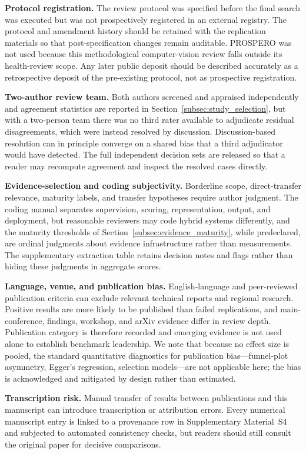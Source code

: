 \documentclass[10pt,a4paper]{article}
\begin{document}
\textbf{Protocol registration.} The review protocol was specified before the final search was executed but was not prospectively registered in an external registry. The protocol and amendment history should be retained with the replication materials so that post-specification changes remain auditable. PROSPERO was not used because this methodological computer-vision review falls outside its health-review scope. Any later public deposit should be described accurately as a retrospective deposit of the pre-existing protocol, not as prospective registration.

\textbf{Two-author review team.} Both authors screened and appraised independently and agreement statistics are reported in Section~\ref{subsec:study_selection}, but with a two-person team there was no third rater available to adjudicate residual disagreements, which were instead resolved by discussion. Discussion-based resolution can in principle converge on a shared bias that a third adjudicator would have detected. The full independent decision sets are released so that a reader may recompute agreement and inspect the resolved cases directly.

\textbf{Evidence-selection and coding subjectivity.} Borderline scope, direct-transfer relevance, maturity labels, and transfer hypotheses require author judgment. The coding manual separates supervision, scoring, representation, output, and deployment, but reasonable reviewers may code hybrid systems differently, and the maturity thresholds of Section~\ref{subsec:evidence_maturity}, while predeclared, are ordinal judgments about evidence infrastructure rather than measurements. The supplementary extraction table retains decision notes and flags rather than hiding these judgments in aggregate scores.

\textbf{Language, venue, and publication bias.} English-language and peer-reviewed publication criteria can exclude relevant technical reports and regional research. Positive results are more likely to be published than failed replications, and main-conference, findings, workshop, and arXiv evidence differ in review depth. Publication category is therefore recorded and emerging evidence is not used alone to establish benchmark leadership. We note that because no effect size is pooled, the standard quantitative diagnostics for publication bias---funnel-plot asymmetry, Egger's regression, selection models---are not applicable here; the bias is acknowledged and mitigated by design rather than estimated.

\textbf{Transcription risk.} Manual transfer of results between publications and this manuscript can introduce transcription or attribution errors. Every numerical manuscript entry is linked to a provenance row in Supplementary Material~S4 and subjected to automated consistency checks, but readers should still consult the original paper for decisive comparisons.
\end{document}
